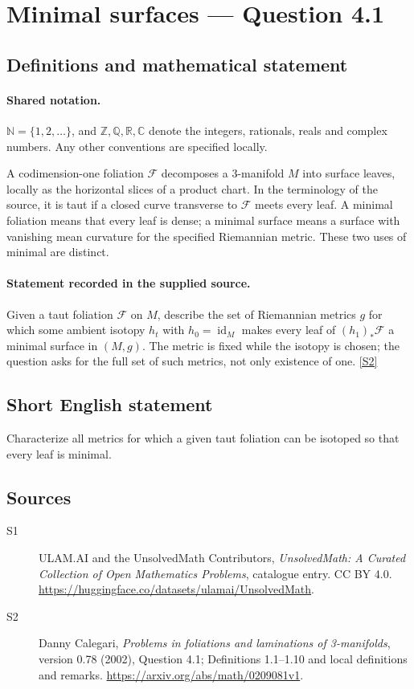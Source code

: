 \documentclass[11pt]{article}
\newcommand{\sref}[2]{\hyperlink{source:#1:#2}{[S#2]}}
\begin{document}
\section{Minimal surfaces — Question 4.1}\label{statement}

\subsection{Definitions and mathematical statement}

\paragraph{Shared notation.}$\mathbb N=\{1,2,\ldots\}$, and $\mathbb Z,\mathbb Q,\mathbb R,\mathbb C$ denote the integers, rationals, reals and complex numbers. Any other conventions are specified locally.


A codimension-one foliation $\mathcal F$ decomposes a $3$-manifold $M$ into surface leaves, locally as the horizontal slices of a product chart. In the terminology of the source, it is taut if a closed curve transverse to $\mathcal F$ meets every leaf. A minimal foliation means that every leaf is dense; a minimal surface means a surface with vanishing mean curvature for the specified Riemannian metric. These two uses of minimal are distinct.
\paragraph{Statement recorded in the supplied source.}
Given a taut foliation $\mathcal F$ on $M$, describe the set of Riemannian metrics $g$ for which some ambient isotopy $h_t$ with $h_0=\operatorname{id}_M$ makes every leaf of $(h_1)_*\mathcal F$ a minimal surface in $(M,g)$. The metric is fixed while the isotopy is chosen; the question asks for the full set of such metrics, not only existence of one. \sref{statement}{2}
\subsection{Short English statement}
Characterize all metrics for which a given taut foliation can be isotoped so that every leaf is minimal.
\subsection{Sources}
\begin{description}
\item[\hypertarget{source:statement:1}{S1}] ULAM.AI and the UnsolvedMath Contributors, \emph{UnsolvedMath: A Curated Collection of Open Mathematics Problems}, catalogue entry. CC BY 4.0. \url{https://huggingface.co/datasets/ulamai/UnsolvedMath}.
\item[\hypertarget{source:statement:2}{S2}] Danny Calegari, \emph{Problems in foliations and laminations of 3-manifolds}, version 0.78 (2002), Question 4.1; Definitions 1.1--1.10 and local definitions and remarks. \url{https://arxiv.org/abs/math/0209081v1}.
\end{description}
\label{end:statement}
\end{document}
